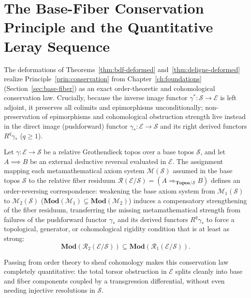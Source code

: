 \section{The Base-Fiber Conservation Principle and the Quantitative Leray Sequence}

The deformations of Theorems~\ref{thm:bdf-deformed} and~\ref{thm:deligne-deformed} realize Principle~\ref{prin:conservation} from Chapter~\ref{ch:foundations} (Section~\ref{sec:base-fiber}) as an exact order-theoretic and cohomological conservation law. Crucially, because the inverse image functor $\gamma^* : \mathcal{S} \to \mathcal{E}$ is left adjoint, it preserves all colimits and epimorphisms unconditionally; non-preservation of epimorphisms and cohomological obstruction strength live instead in the direct image (pushforward) functor $\gamma_* : \mathcal{E} \to \mathcal{S}$ and its right derived functors $R^q\gamma_*$ ($q \ge 1$).

\begin{principle}\label{thm:conservation-law}

Let $\gamma: \mathcal{E} \to \mathcal{S}$ be a relative Grothendieck topos over a base topos $\mathcal{S}$, and let $A \implies B$ be an external deductive reversal evaluated in $\mathcal{E}$. The assignment mapping each metamathematical axiom system $\mathcal{M}(\mathcal{S})$ assumed in the base topos $\mathcal{S}$ to the relative fiber residuum $\mathcal{R}(\mathcal{E}/\mathcal{S}) = (A \Rightarrow_{\mathbf{Topos}/\mathcal{S}} B)$ defines an order-reversing correspondence: weakening the base axiom system from $\mathcal{M}_1(\mathcal{S})$ to $\mathcal{M}_2(\mathcal{S})$ ($\mathbf{Mod}(\mathcal{M}_1) \subsetneq \mathbf{Mod}(\mathcal{M}_2)$) induces a compensatory strengthening of the fiber residuum, transferring the missing metamathematical strength from failures of the pushforward functor $\gamma_*$ and its derived functors $R^q\gamma_*$ to force a topological, generator, or cohomological rigidity condition that is at least as strong:
\[
  \mathbf{Mod}(\mathcal{R}_2(\mathcal{E}/\mathcal{S})) \subseteq \mathbf{Mod}(\mathcal{R}_1(\mathcal{E}/\mathcal{S})).
\]

\end{principle}

Passing from order theory to sheaf cohomology makes this conservation law completely quantitative: the total torsor obstruction in $\mathcal{E}$ splits cleanly into base and fiber components coupled by a transgression differential, without even needing injective resolutions in $\mathcal{S}$.

